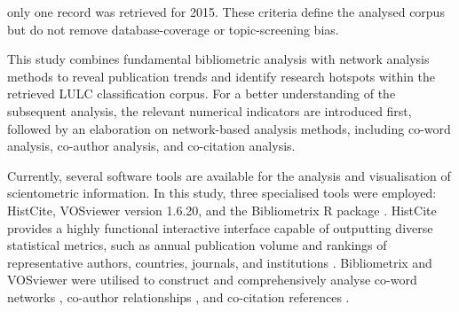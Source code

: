 \documentclass[]{interact}
\theoremstyle{plain}%
\theoremstyle{definition}
\theoremstyle{remark}
\DeclareRobustCommand{\DIFadd}[1]{{\protect\color{DIFaddcolor}\uwave{#1}}}
\DeclareRobustCommand{\DIFdel}[1]{{\protect\color{DIFdelcolor}\sout{#1}}}
\def\DIFadd#1{#1}%
\def\DIFdel#1{}%
\begin{document}
\DIFdel{Material}\DIFdel{)}\DIFdel{.} \DIFdel{This} \DIFdel{resulted} \DIFdel{in} \DIFdel{a} \DIFdel{final} \DIFdel{dataset} \DIFdel{of} \DIFdel{261} \DIFdel{relevant} \DIFdel{publications} \DIFadd{only} \DIFadd{one} \DIFadd{record} \DIFadd{was} \DIFadd{retrieved} \DIFadd{for} \DIFadd{2015}. These \DIFdel{rigorous} \DIFdel{inclusion} criteria \DIFdel{ensure} \DIFdel{a} \DIFdel{high-quality} \DIFdel{sample} \DIFdel{library} \DIFdel{based} \DIFdel{on} \DIFdel{peer-reviewed} \DIFdel{research}\DIFdel{.} \DIFdel{Notably}\DIFdel{,} \DIFdel{Review} \DIFdel{Articles} \DIFdel{were} \DIFdel{excluded} \DIFdel{to} \DIFdel{avoid} \DIFdel{potential} \DIFdel{`}\DIFdel{`}\DIFdel{noise''} \DIFadd{define} \DIFadd{the} \DIFadd{analysed} \DIFadd{corpus} \DIFadd{but} \DIFadd{do} \DIFadd{not} \DIFadd{remove} \DIFadd{database-coverage} or \DIFdel{over-representation} \DIFdel{in} \DIFdel{citation} \DIFdel{analysis}\DIFdel{,} \DIFdel{as} \DIFdel{they} \DIFdel{typically} \DIFdel{cite} \DIFdel{a} \DIFdel{vast} \DIFdel{number} \DIFdel{of} \DIFdel{papers}\DIFdel{.} \DIFdel{Other} \DIFdel{document} \DIFdel{types} \DIFdel{were} \DIFdel{omitted} \DIFdel{due} \DIFdel{to} \DIFdel{their} \DIFdel{limited} \DIFdel{quantity} \DIFdel{and} \DIFdel{lower} \DIFdel{thematic} \DIFdel{relevance}\DIFdel{.} \DIFdel{Consequently}\DIFdel{,} \DIFdel{`}\DIFdel{`}\DIFdel{Articles''} \DIFdel{and} \DIFdel{`}\DIFdel{`}\DIFdel{Proceeding} \DIFdel{Papers''} \DIFdel{were} \DIFdel{selected} \DIFdel{as} \DIFdel{the} \DIFdel{primary} \DIFdel{document} \DIFdel{types} \DIFdel{for} \DIFdel{this} \DIFdel{study} {\hypersetup{citecolor=red}\color{red}\citep{ORIG12}} \DIFadd{topic-screening} \DIFadd{bias}.

This study combines fundamental bibliometric analysis \citep{14,16} with network analysis methods \citep{13} to reveal \DIFdel{global} \DIFdel{academic} \DIFadd{publication} trends and identify research hotspots \DIFdel{in} \DIFadd{within} the \DIFdel{field} \DIFdel{of} \DIFadd{retrieved} LULC \DIFdel{remote} \DIFdel{sensing} classification \DIFadd{corpus}. For a better understanding of the subsequent analysis, the relevant numerical indicators are introduced first, followed by an elaboration on network-based analysis methods, including co-word analysis, co-author analysis, and co-citation analysis. 


Currently, several software tools are available for the analysis and \DIFdel{visualization} \DIFadd{visualisation} of scientometric information. In this study, three \DIFdel{specialized} \DIFadd{specialised} tools were employed: HistCite, VOSviewer \DIFadd{version} \DIFadd{1}\DIFadd{.}\DIFadd{6}\DIFadd{.}\DIFadd{20}, and the Bibliometrix R package \citep{15}. HistCite provides a highly functional interactive interface capable of outputting diverse statistical metrics, such as annual publication volume and rankings of representative authors, countries, journals, and institutions \citep{9}. Bibliometrix and VOSviewer were \DIFdel{utilized} \DIFadd{utilised} to construct and comprehensively \DIFdel{analyze} \DIFadd{analyse} co-word networks \citep{17}, co-author relationships \citep{18}, and co-citation references \citep{19}.
\end{document}
